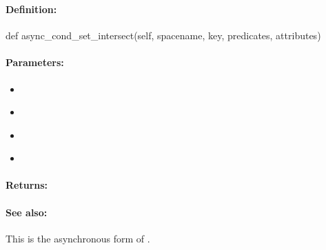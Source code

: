 \pagebreak
\subsubsection{}
\label{api:python:async_cond_set_intersect}


\paragraph{Definition:}
\begin{pythoncode}
def async_cond_set_intersect(self, spacename, key, predicates, attributes)
\end{pythoncode}

\paragraph{Parameters:}
\begin{itemize}[noitemsep]
\item {}\\

\item {}\\

\item {}\\

\item {}\\

\end{itemize}

\paragraph{Returns:}


\paragraph{See also:}  This is the asynchronous form of .

\pagebreak
\subsubsection{}
\label{api:python:set_union}


